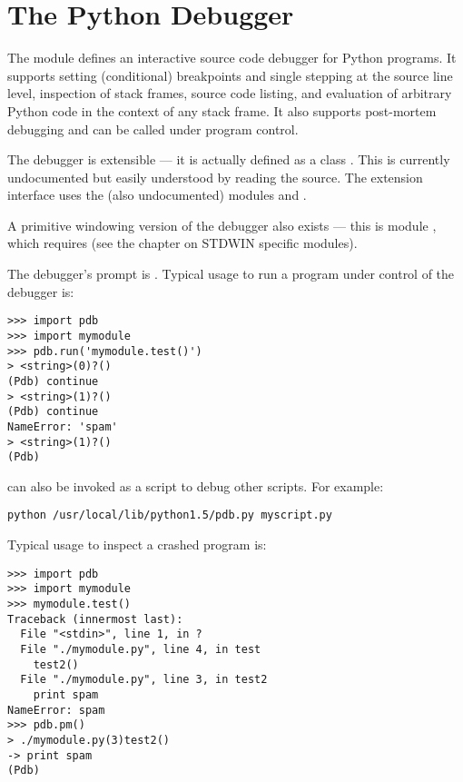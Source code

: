 \chapter{The Python Debugger}
\label{module-pdb}


The module  defines an interactive source code debugger for
Python programs.  It supports setting
(conditional) breakpoints and single stepping
at the source line level, inspection of stack frames, source code
listing, and evaluation of arbitrary Python code in the context of any
stack frame.  It also supports post-mortem debugging and can be called
under program control.

The debugger is extensible --- it is actually defined as a class
.
This is currently undocumented but easily understood by reading the
source.  The extension interface uses the (also undocumented) modules
 and .

A primitive windowing version of the debugger also exists --- this is
module , which requires  (see the chapter
on STDWIN specific modules).

The debugger's prompt is .
Typical usage to run a program under control of the debugger is:

\begin{verbatim}
>>> import pdb
>>> import mymodule
>>> pdb.run('mymodule.test()')
> <string>(0)?()
(Pdb) continue
> <string>(1)?()
(Pdb) continue
NameError: 'spam'
> <string>(1)?()
(Pdb) 
\end{verbatim}

 can also be invoked as
a script to debug other scripts.  For example:

\begin{verbatim}
python /usr/local/lib/python1.5/pdb.py myscript.py
\end{verbatim}

Typical usage to inspect a crashed program is:

\begin{verbatim}
>>> import pdb
>>> import mymodule
>>> mymodule.test()
Traceback (innermost last):
  File "<stdin>", line 1, in ?
  File "./mymodule.py", line 4, in test
    test2()
  File "./mymodule.py", line 3, in test2
    print spam
NameError: spam
>>> pdb.pm()
> ./mymodule.py(3)test2()
-> print spam
(Pdb) 
\end{verbatim}

